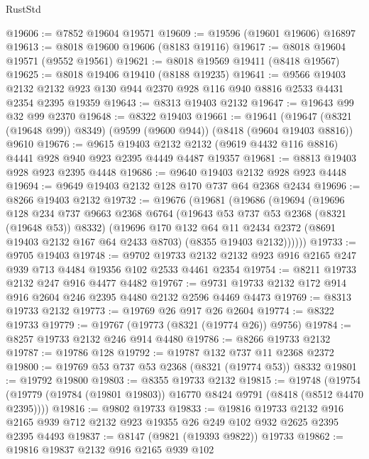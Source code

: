 \begin{lexlean}{RustStd}
\begin{coremodule}
@19606 := @7852 @19604 @19571
@19609 := @19596 (@19601 @19606) @16897
@19613 := @8018 @19600 @19606 (@8183 @19116)
@19617 := @8018 @19604 @19571 (@9552 @19561)
@19621 := @8018 @19569 @19411 (@8418 @19567)
@19625 := @8018 @19406 @19410 (@8188 @19235)
@19641 := @9566
    @19403
    @2132
    @2132
    @923
    @130
    @944
    @2370
    @928
    @116
    @940
    @8816
    @2533
    @4431
    @2354
    @2395
    @19359
@19643 := @8313 @19403 @2132
@19647 := @19643 @99 @32 @99 @2370
@19648 := @8322 @19403
@19661 := @19641
    (@19647 (@8321 (@19648 @99)) @8349)
    (@9599 (@9600 @944))
    (@8418 (@9604 @19403 @8816))
    @9610
@19676 := @9615
    @19403
    @2132
    @2132
    (@9619 @4432 @116 @8816)
    @4441
    @928
    @940
    @923
    @2395
    @4449
    @4487
    @19357
@19681 := @8813 @19403 @928 @923 @2395 @4448
@19686 := @9640 @19403 @2132 @928 @923 @4448
@19694 := @9649 @19403 @2132 @128 @170 @737 @64 @2368 @2434
@19696 := @8266 @19403 @2132
@19732 := @19676
    (@19681
      (@19686
        (@19694
          (@19696
            @128
            @234
            @737
            @9663
            @2368
            @6764
            (@19643 @53 @737 @53 @2368 (@8321 (@19648 @53)) @8332)
            (@19696
              @170
              @132
              @64
              @11
              @2434
              @2372
              (@8691 @19403 @2132 @167 @64 @2433 @8703)
              (@8355 @19403 @2132))))))
@19733 := @9705 @19403
@19748 := @9702
    @19733
    @2132
    @2132
    @923
    @916
    @2165
    @247
    @939
    @713
    @4484
    @19356
    @102
    @2533
    @4461
    @2354
@19754 := @8211 @19733 @2132 @247 @916 @4477 @4482
@19767 := @9731 @19733 @2132 @172 @914 @916 @2604 @246 @2395 @4480 @2132 @2596 @4469 @4473
@19769 := @8313 @19733 @2132
@19773 := @19769 @26 @917 @26 @2604
@19774 := @8322 @19733
@19779 := @19767 (@19773 (@8321 (@19774 @26)) @9756)
@19784 := @8257 @19733 @2132 @246 @914 @4480
@19786 := @8266 @19733 @2132
@19787 := @19786 @128
@19792 := @19787 @132 @737 @11 @2368 @2372
@19800 := @19769 @53 @737 @53 @2368 (@8321 (@19774 @53)) @8332
@19801 := @19792 @19800
@19803 := @8355 @19733 @2132
@19815 := @19748
    (@19754 (@19779 (@19784 (@19801 @19803)) @16770 @8424 @9791 (@8418 (@8512 @4470 @2395))))
@19816 := @9802 @19733
@19833 := @19816
    @19733
    @2132
    @916
    @2165
    @939
    @712
    @2132
    @923
    @19355
    @26
    @249
    @102
    @932
    @2625
    @2395
    @2395
    @4493
@19837 := @8147 (@9821 (@19393 @9822)) @19733
@19862 := @19816
    @19837
    @2132
    @916
    @2165
    @939
    @102

\end{coremodule}
\end{lexlean}
